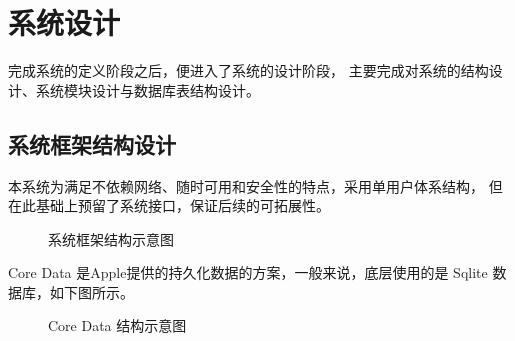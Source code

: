 \chapter{系统设计}
完成系统的定义阶段之后，便进入了系统的设计阶段，
主要完成对系统的结构设计、系统模块设计与数据库表结构设计。
\section{系统框架结构设计}
本系统为满足不依赖网络、随时可用和安全性的特点，采用单用户体系结构，
但在此基础上预留了系统接口，保证后续的可拓展性。

\begin{figure}[H]
	\centering
	\caption{系统框架结构示意图}
    \label{fig:level}
\end{figure}

Core Data 是Apple提供的持久化数据的方案，一般来说，底层使用的是 Sqlite 数据库，如下图所示。
\begin{figure}[H]
	\centering
	\caption{Core Data 结构示意图}
    \label{fig:core_data}
\end{figure}

